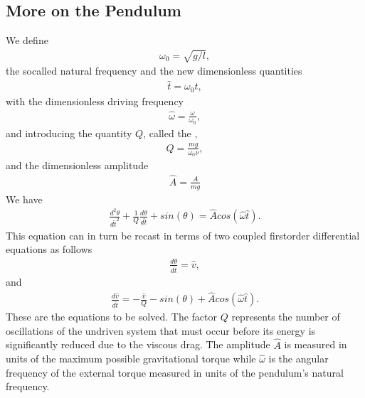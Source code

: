 \documentclass[letterpaper,10pt,english]{sphinxmanual}
\begin{document}
\subsection{More on the Pendulum}
\label{\detokenize{chapter3:id1}}
We define
\begin{equation*}
\begin{split}
\omega_0=\sqrt{g/l},
\end{split}
\end{equation*}
the so\sphinxhyphen{}called natural frequency and the new dimensionless quantities
\begin{equation*}
\begin{split}
\hat{t}=\omega_0t,
\end{split}
\end{equation*}
with the dimensionless driving frequency
\begin{equation*}
\begin{split}
\hat{\omega}=\frac{\omega}{\omega_0},
\end{split}
\end{equation*}
and introducing the quantity \(Q\), called the ,
\begin{equation*}
\begin{split}
Q=\frac{mg}{\omega_0\nu},
\end{split}
\end{equation*}
and the dimensionless amplitude
\begin{equation*}
\begin{split}
\hat{A}=\frac{A}{mg}
\end{split}
\end{equation*}
We have
\begin{equation*}
\begin{split}
\frac{d^2\theta}{d\hat{t}^2}+\frac{1}{Q}\frac{d\theta}{d\hat{t}}  
     +sin(\theta)=\hat{A}cos(\hat{\omega}\hat{t}).
\end{split}
\end{equation*}
This equation can in turn be recast in terms of two coupled first\sphinxhyphen{}order differential equations as follows
\begin{equation*}
\begin{split}
\frac{d\theta}{d\hat{t}}=\hat{v},
\end{split}
\end{equation*}
and
\begin{equation*}
\begin{split}
\frac{d\hat{v}}{d\hat{t}}=-\frac{\hat{v}}{Q}-sin(\theta)+\hat{A}cos(\hat{\omega}\hat{t}).
\end{split}
\end{equation*}
These are the equations to be solved.  The factor \(Q\) represents the number of oscillations of the undriven system that must occur before  its energy is significantly reduced due to the viscous drag. The  amplitude \(\hat{A}\) is measured in units of the maximum possible  gravitational torque while \(\hat{\omega}\) is the angular frequency of the external torque measured in units of the pendulum’s natural frequency.







\renewcommand{\indexname}{Index}
\printindex
\end{document}
